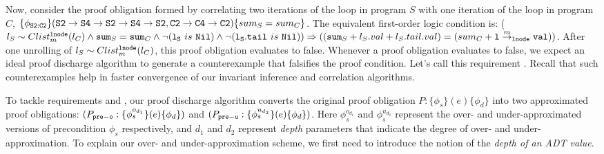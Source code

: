 Now, consider the proof obligation formed by correlating two iterations
of the loop in program $S$ with one iteration of the loop in program $C$,
$\{\phi_{{\tt S2:C2}}\} ({\tt S2\rightarrow S4\rightarrow S2\rightarrow S4\rightarrow S2}, {\tt C2\rightarrow C4\rightarrow C2}) \{sum_{S} = sum_{C}\}$.
The equivalent
first-order logic condition is:
($l_{S}\sim{}Clist^{{\tt lnode}}_{m}(l_{C}) \land {\tt sum}_S={\tt sum}_C \land \neg({\tt l_S}\ is\ {\tt Nil}) \land \neg({\tt l_S.tail}\ is\ {\tt Nil})) \Rightarrow (({\tt sum}_S + l_S.val + l_S.tail.val) = (sum_C + {\tt l} \overset{m}{\rightarrow}_{{\tt lnode}} {\tt val}))$.  After one unrolling
of $l_{S}\sim{}Clist^{{\tt lnode}}_{m}(l_{C})$,
this proof obligation evaluates to false.
Whenever a proof
obligation evaluates to false, we
expect an ideal proof discharge algorithm to generate a
counterexample that falsifies the proof condition.
Let's call this
requirement .
Recall that such counterexamples help in faster
convergence of our invariant inference and correlation algorithms.

To tackle requirements  and ,
our proof discharge algorithm converts the
original proof obligation
$P: \{\phi_s\} (e) \{\phi_d\}$
into two approximated proof obligations:
$(P_{{\tt pre-o}}: \{\phi^{o_{d_1}}_s\} (e) \{\phi_d\})$
and
$(P_{{\tt pre-u}}: \{\phi^{u_{d_2}}_s\} (e) \{\phi_d\})$. Here
$\phi^{o_{d_1}}_s$ and
$\phi^{u_{d_2}}_s$ represent the over- and under-approximated
versions of precondition $\phi_s$ respectively, and $d_1$ and $d_2$ represent
{\em depth} parameters that indicate the degree of over- and
under-approximation.
To explain
our over- and under-approximation scheme, we
first need to
introduce the notion of the {\em depth of an ADT value}.

